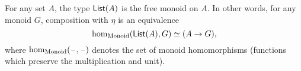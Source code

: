\documentclass[hott-all.tex]{subfiles}
\begin{document}
% 
\begin{lem}
  For any set $A$, the type $\mathsf{List}(A)$ is the free monoid on $A$.
  In other words, for any monoid $G$, composition with $\eta$ is an equivalence
  \[ \hom_{\mathrm{Monoid}}(\mathsf{List}(A),G) \simeq (A\to G), \]
  where $\hom_{\mathrm{Monoid}}(\mathord{\hspace{1pt}\text{--}\hspace{1pt}},\mathord{\hspace{1pt}\text{--}\hspace{1pt}})$ denotes the set of monoid homomorphisms (functions which preserve the multiplication and unit).
\end{lem}
% 
% 
\end{document}
